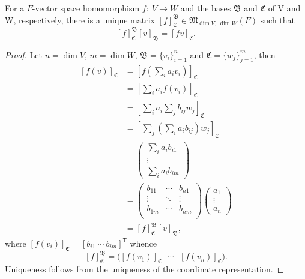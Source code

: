 \begin{theorem}
For a $F$-vector space homomorphism $f:~V\to W$ and the bases $\mathfrak B$ and $\mathfrak C$ of V and W, respectively, there is a unique matrix $[f]^{\mathfrak B}_{\mathfrak C} \in \mathfrak M_{\operatorname{dim}V,~\operatorname{dim}W}(F)$ such that $$[f]^{\mathfrak B}_{\mathfrak C} [v]_{\mathfrak B} = [fv]_{\mathfrak C}.$$
\end{theorem}
\begin{proof}
Let $n=\operatorname{dim}V$, $m=\operatorname{dim}W$, $\mathfrak B = \{ v_i\}_{i=1}^{n}$ and $\mathfrak C = \{ w_j\}_{j=1}^{m}$, then
\begin{align*}
\left[f(v)\right]_\mathfrak C &= \left[f\left(\sum_i a_i v_i \right) \right]_\mathfrak C
  \\ &= \left[\sum_i a_i f\left( v_i \right)\right]_\mathfrak C
  \\ &= \left[\sum_i a_i \sum_j b_{ij} w_j\right]_\mathfrak C
  \\ &= \left[\sum_j \left(\sum_i a_i b_{ij}\right) w_j\right]_\mathfrak C
  \\ &= \begin{pmatrix}\sum_i a_i b_{i1} \\ \vdots \\ \sum_i a_i b_{im}\end{pmatrix}
  \\ &= \begin{pmatrix}b_{11} & \cdots & b_{n1} \\ \vdots & \ddots & \vdots \\ b_{1m} & \cdots & b_{nm} \\ \end{pmatrix}\begin{pmatrix}a_1 \\ \vdots \\ a_n\end{pmatrix}
  \\ &= [f]^{\mathfrak B}_{\mathfrak C} [v]_\mathfrak B,
\end{align*} where $[f(v_i)]_\mathfrak C = [b_{i1} ~ \cdots ~ b_{im}]^\mathsf T$ whence $$[f]^\mathfrak B _ \mathfrak C = \bigg( [f(v_1)]_\mathfrak C ~~~ \cdots ~~~ [f(v_n)]_\mathfrak C \bigg).$$ Uniqueness follows from the uniqueness of the coordinate representation.
\end{proof}

